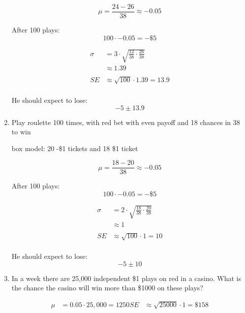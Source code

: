 \documentclass[portrait]{exam}
\begin{document}
\begin{enumerate}
\begin{solution}
        \[
          \mu = \frac{24 - 26}{38} \approx -0.05
        \]

        After 100 plays:
        \[
          100 \cdot -0.05 = -\$5
        \]

        \begin{align*}
          \sigma &= 3 \cdot \sqrt{\frac{12}{38} \cdot \frac{26}{38}} \\
          & \approx 1.39 \\
          \\
          SE &\approx \sqrt{100} \cdot 1.39 = 13.9 \\
        \end{align*}

        He should expect to lose:
        \[
          -5 \pm 13.9
        \]

      \end{solution}
    \item Play roulette 100 times, with red bet with even payoff and 18
      chances in 38 to win

      \begin{solution}
        box model: 20 -\$1 tickets and 18 \$1 ticket

        \[
          \mu = \frac{18 - 20}{38} \approx -0.05
        \]

        After 100 plays:
        \[
          100 \cdot -0.05 = -\$5
        \]

        \begin{align*}
          \sigma & = 2 \cdot \sqrt{\frac{18}{38} \cdot \frac{20}{38}} \\
                 & \approx 1 \\
          \\
          SE     & \approx \sqrt{100} \cdot 1 = 10 \\
        \end{align*}

        He should expect to lose:
        \[
          -5 \pm 10
        \]
      \end{solution}

    \item In a week there are 25,000 independent \$1 plays on red in a casino.
      What is the chance the casino will win more than \$1000 on these plays?

      \begin{solution}
        \begin{align*}
          \mu & = 0.05 \cdot 25,000 = 1250
          SE  & \approx \sqrt{25000} \cdot 1 = \$158 \\
        \end{align*}


\end{solution}
\end{enumerate}
\end{document}
